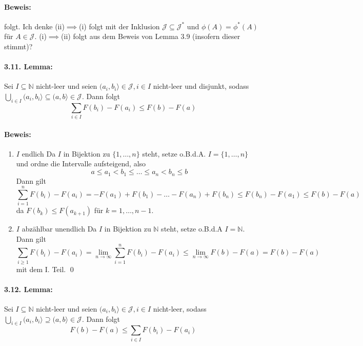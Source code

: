 \paragraph{Beweis:} folgt. Ich denke (ii)$\implies$(i) folgt mit der Inklusion $\mathcal{J}\subseteq\mathcal{J}^*$ und $\phi(A)=\phi^*(A)$ f\"ur $A\in\mathcal{J}$. (i)$\implies$(ii) folgt aus dem Beweis von Lemma 3.9 (insofern dieser stimmt)?

\paragraph{3.11. Lemma:}Sei $I\subseteq\mathbb{N}$ nicht-leer und seien $(a_i,b_i\rangle\in\mathcal{J},i\in I$ nicht-leer und disjunkt, sodass $\bigcup_{i\in I}(a_i,b_i\rangle\subseteq(a,b\rangle\in\mathcal{J}$. Dann folgt 
$$\sum_{i\in I}F(b_i)-F(a_i)\leq F(b)-F(a)$$

\paragraph{Beweis:}
\begin{enumerate}[label=\Roman*.]
    \item $I$ endlich\newline
    Da $I$ in Bijektion zu $\{1,\hdots,n\}$ steht, setze o.B.d.A. $I=\{1,\hdots,n\}$ und ordne die Intervalle aufsteigend, also
    $$a\leq a_1<b_1\leq\hdots\leq a_n<b_n\leq b$$
    Dann gilt
    $$\sum_{i=1}^nF(b_i)-F(a_i)=-F(a_1)+F(b_1)-\hdots-F(a_n)+F(b_n)\leq F(b_n)-F(a_1)\leq F(b)-F(a)$$
    da $F(b_k)\leq F(a_{k+1})$ f\"ur $k=1,\hdots,n-1$. 
    \item $I$ abz\"ahlbar unendlich\newline
    Da $I$ in Bijektion zu $\mathbb{N}$ steht, setze o.B.d.A $I=\mathbb{N}$. Dann gilt
    $$\sum_{i\geq1}F(b_i)-F(a_i)=\lim_{n\to\infty}\sum_{i=1}^nF(b_i)-F(a_i)\leq\lim_{n\to\infty}F(b)-F(a)=F(b)-F(a)$$
    mit dem I. Teil. \qed
\end{enumerate}

\paragraph{3.12. Lemma:} Sei $I\subseteq\mathbb{N}$ nicht-leer und seien $(a_i,b_i\rangle\in\mathcal{J},i\in I$ nicht-leer, sodass $\bigcup_{i\in I}(a_i,b_i\rangle\supseteq(a,b\rangle\in\mathcal{J}$. Dann folgt
$$F(b)-F(a)\leq\sum_{i\in I}F(b_i)-F(a_i)$$

